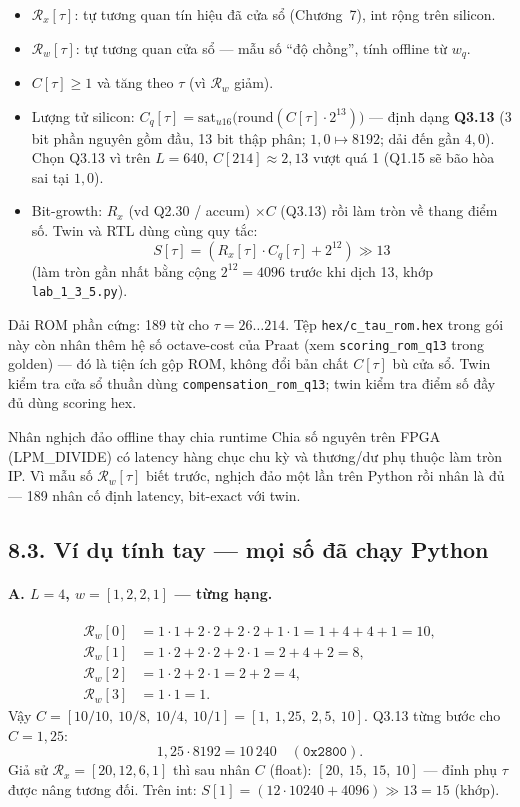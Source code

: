 \begin{itemize}[leftmargin=1.4em]
\item $\mathcal{R}_x[\tau]$: tự tương quan tín hiệu đã cửa sổ (Chương~7), int rộng trên silicon.
\item $\mathcal{R}_w[\tau]$: tự tương quan cửa sổ --- mẫu số ``độ chồng'', tính offline từ $w_q$.
\item $C[\tau]\ge 1$ và tăng theo $\tau$ (vì $\mathcal{R}_w$ giảm).
\item Lượng tử silicon: $C_q[\tau] = \mathrm{sat}_{u16}\!\bigl(\mathrm{round}(C[\tau]\cdot 2^{13})\bigr)$ --- định dạng \textbf{Q3.13} (3 bit phần nguyên gồm đầu, 13 bit thập phân; $1{,}0\mapsto 8192$; dải đến gần $4{,}0$). Chọn Q3.13 vì trên $L=640$, $C[214]\approx 2{,}13$ vượt quá 1 (Q1.15 sẽ bão hòa sai tại $1{,}0$).
\item Bit-growth: $R_x$ (vd Q2.30 / accum) $\times C$ (Q3.13) rồi làm tròn về thang điểm số. Twin và RTL dùng cùng quy tắc:
\[
S[\tau] = (R_x[\tau]\cdot C_q[\tau] + 2^{12}) \gg 13
\]
(làm tròn gần nhất bằng cộng $2^{12}=4096$ trước khi dịch 13, khớp \texttt{lab\_1\_3\_5.py}).
\end{itemize}

Dải ROM phần cứng: 189 từ cho $\tau = 26\ldots 214$. Tệp \texttt{hex/c\_tau\_rom.hex} trong gói này còn nhân thêm hệ số octave-cost của Praat (xem \texttt{scoring\_rom\_q13} trong golden) --- đó là tiện ích gộp ROM, không đổi bản chất $C[\tau]$ bù cửa sổ. Twin kiểm tra cửa sổ thuần dùng \texttt{compensation\_rom\_q13}; twin kiểm tra điểm số đầy đủ dùng scoring hex.

\begin{firstprin}{Nhân nghịch đảo offline thay chia runtime}
Chia số nguyên trên FPGA (LPM\_DIVIDE) có latency hàng chục chu kỳ và thương/dư phụ thuộc làm tròn IP. Vì mẫu số $\mathcal{R}_w[\tau]$ biết trước, nghịch đảo một lần trên Python rồi nhân là đủ --- 189 nhân cố định latency, bit-exact với twin.
\end{firstprin}

\subsection*{8.3. Ví dụ tính tay --- mọi số đã chạy Python}

\paragraph{A. $L=4$, $w=[1,2,2,1]$ --- từng hạng.}
\begin{align*}
\mathcal{R}_w[0] &= 1\cdot 1 + 2\cdot 2 + 2\cdot 2 + 1\cdot 1 = 1+4+4+1 = 10,\\
\mathcal{R}_w[1] &= 1\cdot 2 + 2\cdot 2 + 2\cdot 1 = 2+4+2 = 8,\\
\mathcal{R}_w[2] &= 1\cdot 2 + 2\cdot 1 = 2+2 = 4,\\
\mathcal{R}_w[3] &= 1\cdot 1 = 1.
\end{align*}
Vậy $C = [10/10,\ 10/8,\ 10/4,\ 10/1] = [1,\ 1{,}25,\ 2{,}5,\ 10]$. Q3.13 từng bước cho $C=1{,}25$:
\[
1{,}25\cdot 8192 = 10\,240 \quad(\texttt{0x2800}).
\]
Giả sử $\mathcal{R}_x = [20,12,6,1]$ thì sau nhân $C$ (float): $[20,\ 15,\ 15,\ 10]$ --- đỉnh phụ $\tau$ được nâng tương đối. Trên int: $S[1]=(12\cdot 10240 + 4096)\gg 13 = 15$ (khớp).

